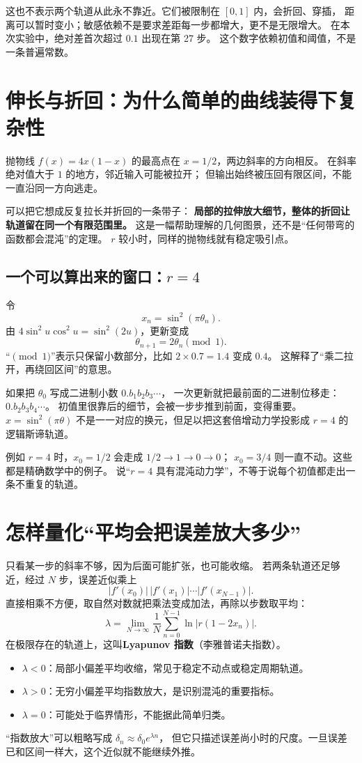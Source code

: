 \documentclass[UTF8,11pt,fontset=none]{ctexart}
\begin{document}
这也不表示两个轨道从此永不靠近。它们被限制在 $[0,1]$ 内，会折回、穿插，
距离可以暂时变小；敏感依赖不是要求差距每一步都增大，更不是无限增大。
在本次实验中，绝对差首次超过 $0.1$ 出现在第 27 步。
这个数字依赖初值和阈值，不是一条普遍常数。

\section{伸长与折回：为什么简单的曲线装得下复杂性}
抛物线 $f(x)=4x(1-x)$ 的最高点在 $x=1/2$，两边斜率的方向相反。
在斜率绝对值大于 $1$ 的地方，邻近输入可能被拉开；
但输出始终被压回有限区间，不能一直沿同一方向逃走。

可以把它想成反复拉长并折回的一条带子：
\textbf{局部的拉伸放大细节，整体的折回让轨道留在同一个有限范围里。}
这是一幅帮助理解的几何图景，还不是“任何带弯的函数都会混沌”的定理。
$r$ 较小时，同样的抛物线就有稳定吸引点。

\subsection{一个可以算出来的窗口：\texorpdfstring{$r=4$}{r=4}}
令
\[
x_n=\sin^2(\pi\theta_n).
\]
由 $4\sin^2u\cos^2u=\sin^2(2u)$，更新变成
\[
\theta_{n+1}=2\theta_n\pmod1.
\]
“$\pmod1$”表示只保留小数部分，比如 $2\times0.7=1.4$ 变成 $0.4$。
这解释了“乘二拉开，再绕回区间”的意思。

如果把 $\theta_0$ 写成二进制小数 $0.b_1b_2b_3\cdots$，
一次更新就把最前面的二进制位移走：$0.b_2b_3b_4\cdots$。
初值里很靠后的细节，会被一步步推到前面，变得重要。
$x=\sin^2(\pi\theta)$ 不是一一对应的换元，但足以把这套倍增动力学投影成 $r=4$ 的逻辑斯谛轨道。

\begin{warnbox}[混沌系统仍然有特殊轨道]
例如 $r=4$ 时，$x_0=1/2$ 会走成 $1/2\to1\to0\to0$；
$x_0=3/4$ 则一直不动。这些都是精确数学中的例子。
说“$r=4$ 具有混沌动力学”，不等于说每个初值都走出一条不重复的轨道。
\end{warnbox}

\section{怎样量化“平均会把误差放大多少”}
只看某一步的斜率不够，因为后面可能扩张，也可能收缩。
若两条轨道还足够近，经过 $N$ 步，误差近似乘上
\[
|f'(x_0)|\,|f'(x_1)|\cdots|f'(x_{N-1})|.
\]
直接相乘不方便，取自然对数就把乘法变成加法，再除以步数取平均：
\[
\boxed{\lambda=\lim_{N\to\infty}\frac1N
\sum_{n=0}^{N-1}\ln|r(1-2x_n)|.}
\]
在极限存在的轨道上，这叫\textbf{Lyapunov 指数}（李雅普诺夫指数）。
\begin{itemize}
\item $\lambda<0$：局部小偏差平均收缩，常见于稳定不动点或稳定周期轨道。
\item $\lambda>0$：无穷小偏差平均指数放大，是识别混沌的重要指标。
\item $\lambda=0$：可能处于临界情形，不能据此简单归类。
\end{itemize}
“指数放大”可以粗略写成 $\delta_n\approx\delta_0e^{\lambda n}$，
但它只描述误差尚小时的尺度。一旦误差已和区间一样大，这个近似就不能继续外推。
\end{document}
